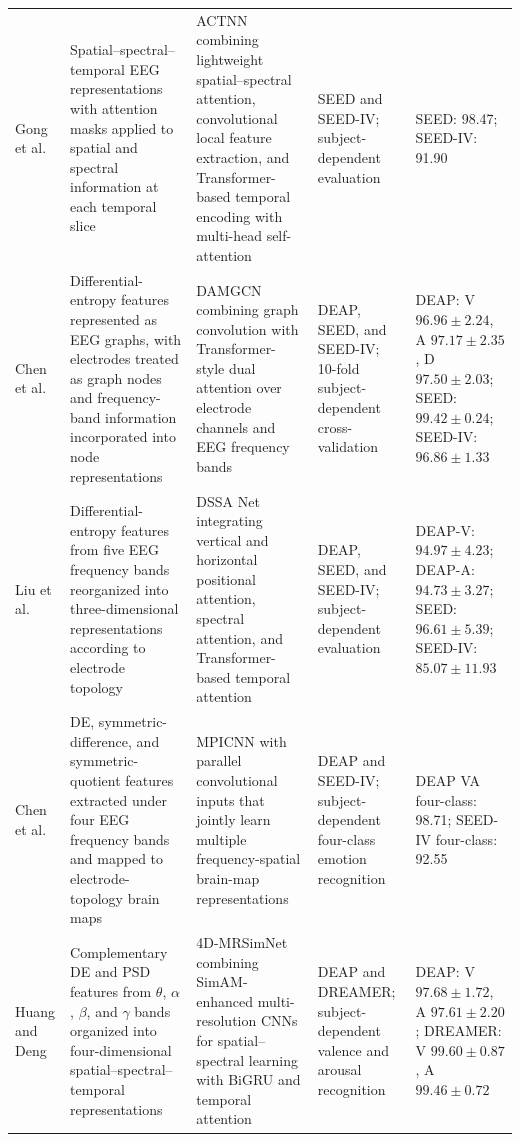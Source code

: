 \documentclass{WileyMSP-template}
\newcommand{\lightrowsep}{%
    \arrayrulecolor{lightrowgray}%
    \specialrule{0.30pt}{3.5pt}{3.5pt}%
    \arrayrulecolor{black}%
}
\begin{document}
\begin{table}
\begin{tabularx}{\textheight}{
>{\raggedright\arraybackslash}p{3.15cm}
>{\raggedright\arraybackslash}X
>{\raggedright\arraybackslash}X
>{\raggedright\arraybackslash}p{3.65cm}
>{\raggedright\arraybackslash}p{5.15cm}}
\lightrowsep

Gong et al. \cite{gong2023_actnn} &
Spatial--spectral--temporal EEG representations with attention masks applied
to spatial and spectral information at each temporal slice &
ACTNN combining lightweight spatial--spectral attention,
convolutional local feature extraction,
and Transformer-based temporal encoding with multi-head self-attention &
SEED and SEED-IV; subject-dependent evaluation &
SEED: 98.47;
SEED-IV: 91.90 \\

\lightrowsep

Chen et al. \cite{chen2024_damgcn} &
Differential-entropy features represented as EEG graphs,
with electrodes treated as graph nodes and frequency-band information
incorporated into node representations &
DAMGCN combining graph convolution with Transformer-style dual attention
over electrode channels and EEG frequency bands &
DEAP, SEED, and SEED-IV; 10-fold subject-dependent cross-validation &
DEAP: V $96.96 \pm 2.24$, A $97.17 \pm 2.35$, D $97.50 \pm 2.03$;
SEED: $99.42 \pm 0.24$;
SEED-IV: $96.86 \pm 1.33$ \\

\lightrowsep

Liu et al. \cite{liu2025_dssanet} &
Differential-entropy features from five EEG frequency bands reorganized
into three-dimensional representations according to electrode topology &
DSSA Net integrating vertical and horizontal positional attention,
spectral attention, and Transformer-based temporal attention &
DEAP, SEED, and SEED-IV; subject-dependent evaluation &
DEAP-V: $94.97 \pm 4.23$;
DEAP-A: $94.73 \pm 3.27$;
SEED: $96.61 \pm 5.39$;
SEED-IV: $85.07 \pm 11.93$ \\

\lightrowsep

Chen et al. \cite{chen2025_mpicnn} &
DE, symmetric-difference, and symmetric-quotient features extracted
under four EEG frequency bands and mapped to electrode-topology brain maps &
MPICNN with parallel convolutional inputs that jointly learn
multiple frequency-spatial brain-map representations &
DEAP and SEED-IV; subject-dependent four-class emotion recognition &
DEAP VA four-class: 98.71;
SEED-IV four-class: 92.55 \\

\lightrowsep

Huang and Deng \cite{huang2026_4dmrsimnet} &
Complementary DE and PSD features from $\theta$, $\alpha$, $\beta$, and $\gamma$
bands organized into four-dimensional spatial--spectral--temporal representations &
4D-MRSimNet combining SimAM-enhanced multi-resolution CNNs
for spatial--spectral learning with BiGRU and temporal attention &
DEAP and DREAMER; subject-dependent valence and arousal recognition &
DEAP: V $97.68 \pm 1.72$, A $97.61 \pm 2.20$;
DREAMER: V $99.60 \pm 0.87$, A $99.46 \pm 0.72$ \\


\end{tabularx}
\end{table}
\end{document}
